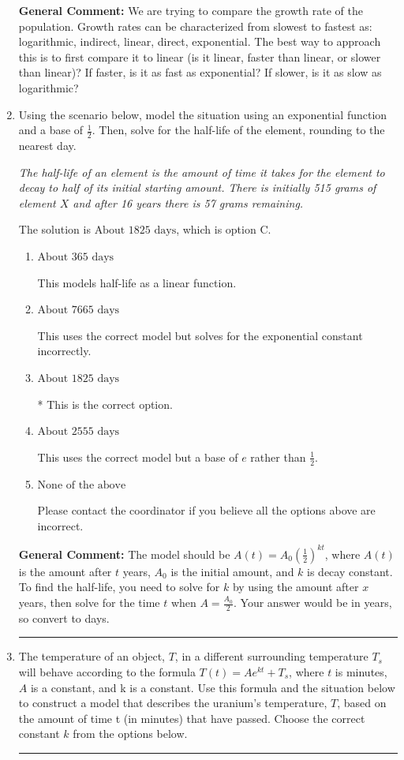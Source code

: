 \documentclass{extbook}[14pt]
\newcommand{\litem}[1]{\item #1

\rule{\textwidth}{0.4pt}}
\begin{document}
\begin{enumerate}
{\textbf{General Comment:} We are trying to compare the growth rate of the population. Growth rates can be characterized from slowest to fastest as: logarithmic, indirect, linear, direct, exponential. The best way to approach this is to first compare it to linear (is it linear, faster than linear, or slower than linear)? If faster, is it as fast as exponential? If slower, is it as slow as logarithmic?
}
\litem{
Using the scenario below, model the situation using an exponential function and a base of $\frac{1}{2}$. Then, solve for the half-life of the element, rounding to the nearest day.

\begin{center}
    \textit{ The half-life of an element is the amount of time it takes for the element to decay to half of its initial starting amount. There is initially 515 grams of element $X$ and after 16 years there is 57 grams remaining. }
\end{center}


The solution is \( \text{About } 1825 \text{ days} \), which is option C.\begin{enumerate}[label=\Alph*.]
\item \( \text{About } 365 \text{ days} \)

This models half-life as a linear function.
\item \( \text{About } 7665 \text{ days} \)

This uses the correct model but solves for the exponential constant incorrectly.
\item \( \text{About } 1825 \text{ days} \)

* This is the correct option.
\item \( \text{About } 2555 \text{ days} \)

This uses the correct model but a base of $e$ rather than $\frac{1}{2}$.
\item \( \text{None of the above} \)

Please contact the coordinator if you believe all the options above are incorrect.
\end{enumerate}

\textbf{General Comment:} The model should be $A(t) = A_0 (\frac{1}{2})^{kt}$, where $A(t)$ is the amount after $t$ years, $A_0$ is the initial amount, and $k$ is decay constant. To find the half-life, you need to solve for $k$ by using the amount after $x$ years, then solve for the time $t$ when $A = \frac{A_0}{2}$. Your answer would be in years, so convert to days.
}
\litem{
The temperature of an object, $T$, in a different surrounding temperature $T_s$ will behave according to the formula $T(t) = Ae^{kt} + T_s$, where $t$ is minutes, $A$ is a constant, and k is a constant. Use this formula and the situation below to construct a model that describes the uranium's temperature, $T$, based on the amount of time t (in minutes) that have passed. Choose the correct constant $k$ from the options below.

}
\end{enumerate}
\end{document}
